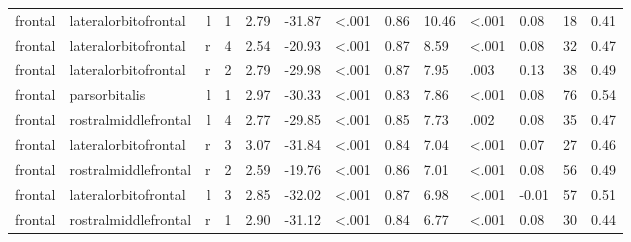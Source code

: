 \documentclass{article}
\begin{document}
\begin{longtable}{llrR{1.3cm}R{1cm}R{1.3cm}R{1cm}R{1cm}R{1.3cm}R{1cm}R{1.8cm}R{1.3cm}R{1.8cm}}
\bottomrule
\endlastfoot
   frontal &      lateralorbitofrontal &    l &         1 &                  2.79 &           -31.87 &      \textless.001 &                               0.86 &                         10.46 &                   \textless.001 &   0.08 &     18 &      0.41 \\
   frontal &      lateralorbitofrontal &    r &         4 &                  2.54 &           -20.93 &      \textless.001 &                               0.87 &                          8.59 &                   \textless.001 &   0.08 &     32 &      0.47 \\
   frontal &      lateralorbitofrontal &    r &         2 &                  2.79 &           -29.98 &      \textless.001 &                               0.87 &                          7.95 &                            .003 &   0.13 &     38 &      0.49 \\
   frontal &             parsorbitalis &    l &         1 &                  2.97 &           -30.33 &      \textless.001 &                               0.83 &                          7.86 &                   \textless.001 &   0.08 &     76 &      0.54 \\
   frontal &      rostralmiddlefrontal &    l &         4 &                  2.77 &           -29.85 &      \textless.001 &                               0.85 &                          7.73 &                            .002 &   0.08 &     35 &      0.47 \\
   frontal &      lateralorbitofrontal &    r &         3 &                  3.07 &           -31.84 &      \textless.001 &                               0.84 &                          7.04 &                   \textless.001 &   0.07 &     27 &      0.46 \\
   frontal &      rostralmiddlefrontal &    r &         2 &                  2.59 &           -19.76 &      \textless.001 &                               0.86 &                          7.01 &                   \textless.001 &   0.08 &     56 &      0.49 \\
   frontal &      lateralorbitofrontal &    l &         3 &                  2.85 &           -32.02 &      \textless.001 &                               0.87 &                          6.98 &                   \textless.001 &  -0.01 &     57 &      0.51 \\
   frontal &      rostralmiddlefrontal &    r &         1 &                  2.90 &           -31.12 &      \textless.001 &                               0.84 &                          6.77 &                   \textless.001 &   0.08 &     30 &      0.44 \\

\end{longtable}
\end{document}
